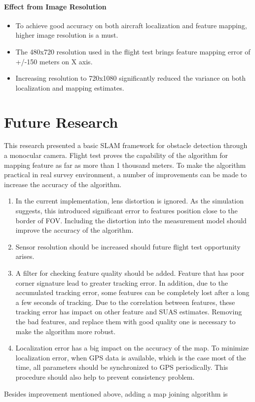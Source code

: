 \paragraph{Effect from Image Resolution}
\begin{itemize}
  \item To achieve good accuracy on both aircraft localization and
  feature mapping, higher image resolution is a must. 
  \item The 480x720 resolution used in the flight test brings feature
  mapping error of +/-150 meters on X axis.
  \item Increasing resolution to 720x1080 significantly reduced the
  variance on both localization and mapping estimates. 
\end{itemize}

\section{Future Research}
This research presented a basic SLAM framework for obstacle detection
through a monocular camera. Flight test proves the capability of the
algorithm for mapping feature as far as more than 1 thousand meters.
To make the algorithm practical in real survey environment, a number
of improvements can be made to increase the accuracy of the algorithm.
\begin{enumerate}
  \item In the current implementation, lens distortion is ignored. As
  the simulation suggests, this introduced significant error to
  features position close to the border of FOV. Including the
  distortion into the measurement model should improve the accuracy of
  the algorithm.
  \item Sensor resolution should be increased should future flight
  test opportunity arises. 
  \item A filter for checking feature quality should be
  added. Feature that has poor corner signature lead to greater
  tracking error. In addition, due to the accumulated tracking error,
  some features can be completely lost after a long a few seconds of
  tracking. Due to the correlation between features, these tracking
  error has impact on other feature and SUAS estimates. Removing the
  bad features, and replace them with good quality one is necessary to
  make the algorithm more robust. 
  \item Localization error has a big impact on the accuracy of the
  map. To minimize localization error, when GPS data is available,
  which is the case most of the time, all parameters should be
  synchronized to GPS periodically. This procedure should also help
  to prevent consistency problem. 
\end{enumerate}

Besides improvement mentioned above, adding a map joining algorithm is

